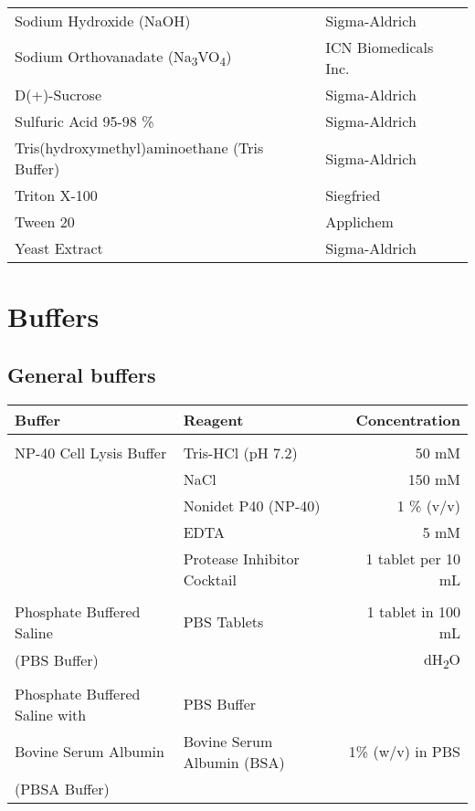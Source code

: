 \begin{center}
\begin{longtable}{l l}
Sodium Hydroxide (NaOH) & Sigma-Aldrich \\
Sodium Orthovanadate (Na\textsubscript{3}VO\textsubscript{4}) & ICN Biomedicals Inc.\\ 
D(+)-Sucrose & Sigma-Aldrich \\
Sulfuric Acid 95-98 \% & Sigma-Aldrich\\
Tris(hydroxymethyl)aminoethane (Tris Buffer) & Sigma-Aldrich \\
Triton X-100 & Siegfried \\
Tween 20 & Applichem \\
Yeast Extract & Sigma-Aldrich \\




\end{longtable}

\end{center}



\section{Buffers}

\subsection{General buffers}

\begin{tabular}{l l r}
\textbf{Buffer} & \textbf{Reagent} & \textbf{Concentration}\\
\hline
\\
NP-40 Cell Lysis Buffer & Tris-HCl (pH 7.2) & 50 mM\\ & NaCl & 150 mM \\ & Nonidet P40 (NP-40) & 1 \% (v/v) \\ & EDTA & 5 mM \\ & Protease Inhibitor Cocktail & 1 tablet per 10 mL \\  
\\
Phosphate Buffered Saline & PBS Tablets & 1 tablet in 100 mL \\ 
(PBS Buffer) & & dH\textsubscript{2}O\\
\\
Phosphate Buffered Saline with & PBS Buffer & \\
Bovine Serum Albumin & Bovine Serum Albumin (BSA) & 1\% (w/v) in PBS \\
(PBSA Buffer) & & \\
\end{tabular}



